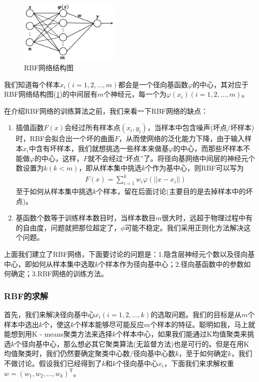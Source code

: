 {            \begin{figure}[H]
            \centering
            \includegraphics[height=3cm]{images/RBF_net_stucture.jpg}
            \caption{RBF网络结构图}
            \label{fig:RBF网络结构图}
            \end{figure}
            我们知道每个样本$x_i(i=1,2,\dots,m)$都会是一个径向基函数$\varphi$的中心，其对应于RBF网络结构图(\ref{fig:RBF网络结构图})的中间层有$m$个神经元，每一个为$\varphi(x_i)(i=1,2,\dots,m)$。
            \par
            在介绍RBF网络的训练算法之前，我们来看一下RBF网络的缺点：
            \begin{enumerate}
            \item 插值函数$F(x)$会经过所有样本点$(x_i,y_i)$，当样本中包含噪声(坏点/坏样本)时，RBF会拟合出一个坏的曲面$F$，从而使网络的泛化能力下降，由于输入样本$x_i$中含有坏样本，我们就想挑选一些样本来做基$\varphi$的中心，而那些坏样本不能做$\varphi$的中心，这样，$F$就不会经过“坏点”了。将径向基网络中间层的神经元个数设置为$k(k<m)$，即从样本集中挑选$k$个作为基中心，则RBF可以写为
            \begin{align*}
            F(x) = \sum_{i=1}^k w_i \varphi(||x-x_i||)
            \end{align*}
            至于如何从样本集中挑选$k$个样本，留在后面讨论(主要目的是去掉样本中的坏点)。
            \item 基函数个数等于训练样本数目时，当样本数目$m$很大时，远超于物理过程中有的自由度，问题就把那位超定了，$\phi$可能不稳定。我们采用正则化方法解决这个问题。
            \end{enumerate}
            \par
            上面我们建立了RBF网络，下面要讨论的问题是：1.隐含层神经元个数以及径向基中心，即如何从样本集中选取$k$个样本作为径向基中心；2.径向基函数中的参数如何确定；3.RBF网络的训练方法。
        \subsubsection{RBF的求解}
            \par
            首先，我们来解决径向基中心$x_i(i = 1,2,\dots,k)$的选取问题。我们的目标是从$m$个样本中选出$k$个，使这$k$个样本能够尽可能反应$m$个样本的特征。聪明如我，马上就能想到用K - means聚类方法来选择$k$个样本中心，如果我们能通过K均值聚类来挑选$k$个径向基中心，那么想必其它聚类算法(无监督方法)也是可行的。但是在用K均值聚类时，我们仍然要确定聚类中心数/径向基中心数$k$，至于如何确定$k$，我们不做讨论。假设我们已经得到了$k$和$k$个径向基中心$x_i$，下面我们来求解权重$w = (w_1,w_2,\dots,w_k)^\mathrm{T}$。
}
